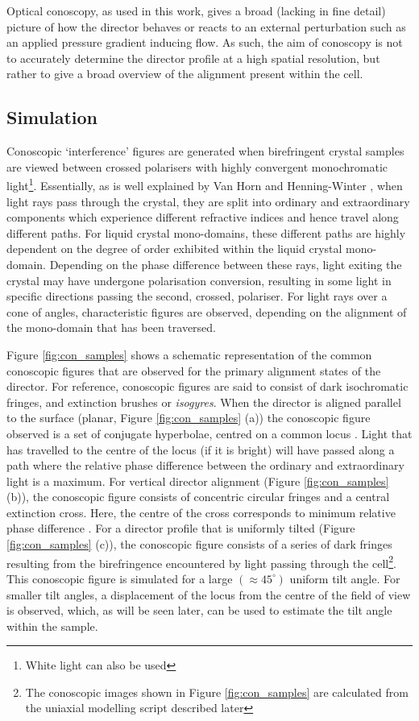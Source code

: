 Optical conoscopy, as used in this work, gives a broad (lacking in fine detail) picture of how the director behaves or reacts to an external perturbation such as an applied pressure gradient inducing flow. As such, the aim of conoscopy is not to accurately determine the director profile at a high spatial resolution, but rather to give a broad overview of the alignment present within the cell.

\subsection{Simulation}
Conoscopic `interference' figures are generated when birefringent crystal samples are viewed between crossed polarisers with highly convergent monochromatic light\footnote{White light can also be used}. Essentially, as is well explained by Van Horn and Henning-Winter \cite{Horn2001}, when light rays pass through the crystal, they are split into ordinary and extraordinary components which experience different refractive indices and hence travel along different paths. For liquid crystal mono-domains, these different paths are highly dependent on the degree of order exhibited within the liquid crystal mono-domain. Depending on the phase difference between these rays, light exiting the crystal may have undergone polarisation conversion, resulting in some light in specific directions passing the second, crossed, polariser. For light rays over a cone of angles, characteristic figures are observed, depending on the alignment of the mono-domain that has been traversed.

Figure \ref{fig:con_samples} shows a schematic representation of the common conoscopic figures that are observed for the primary alignment states of the director. For reference, conoscopic figures are said to consist of dark isochromatic fringes, and extinction brushes or \textit{isogyres}. When the director is aligned parallel to the surface (planar, Figure \ref{fig:con_samples} (a)) the conoscopic figure observed is a set of conjugate hyperbolae, centred on a common locus \cite{Horn2001}. Light that has travelled to the centre of the locus (if it is bright) will have passed along a path where the relative phase difference between the ordinary and extraordinary light is a maximum. For vertical director alignment (Figure \ref{fig:con_samples} (b)), the conoscopic figure consists of concentric circular fringes and a central extinction cross. Here, the centre of the cross corresponds to minimum relative phase difference \cite{Horn2001}. For a director profile that is uniformly tilted (Figure \ref{fig:con_samples} (c)), the conoscopic figure consists of a series of dark fringes resulting from the birefringence encountered by light passing through the cell\footnote{The conoscopic images shown in Figure \ref{fig:con_samples} are calculated from the uniaxial modelling script described later}. This conoscopic figure is simulated for a large $\left(\approx45^{\circ}\right)$ uniform tilt angle. For smaller tilt angles, a displacement of the locus from the centre of the field of view is observed, which, as will be seen later, can be used to estimate the tilt angle within the sample.

